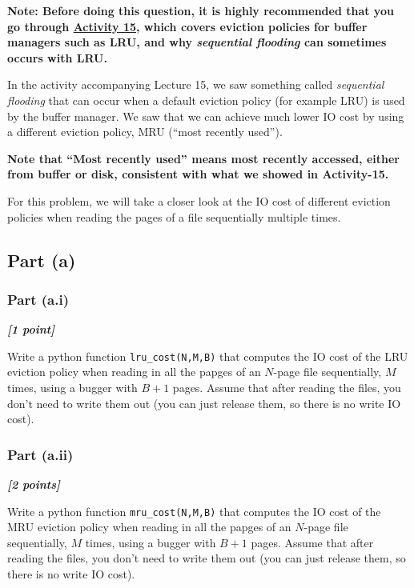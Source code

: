 \documentclass[11pt]{article}
\begin{document}
    \textbf{Note: Before doing this question, it is highly recommended that
you go through \href{./Activity-15.ipynb}{Activity 15}, which covers
eviction policies for buffer managers such as LRU, and why
\emph{sequential flooding} can sometimes occurs with LRU.}

In the activity accompanying Lecture 15, we saw something called
\emph{sequential flooding} that can occur when a default eviction policy
(for example LRU) is used by the buffer manager. We saw that we can
achieve much lower IO cost by using a different eviction policy, MRU
(``most recently used'').

\textbf{Note that ``Most recently used'' means most recently accessed,
either from buffer or disk, consistent with what we showed in
Activity-15.}

For this problem, we will take a closer look at the IO cost of different
eviction policies when reading the pages of a file sequentially multiple
times.

\hypertarget{part-a}{%
\subsection{Part (a)}\label{part-a}}

\hypertarget{part-a.i}{%
\subsubsection{Part (a.i)}\label{part-a.i}}

\textbf{\emph{{[}1 point{]}}}

Write a python function \texttt{lru\_cost(N,M,B)} that computes the IO
cost of the LRU eviction policy when reading in all the papges of an
\(N\)-page file sequentially, \(M\) times, using a bugger with \(B+1\)
pages. Assume that after reading the files, you don't need to write them
out (you can just release them, so there is no write IO cost).

    \hypertarget{part-a.ii}{%
\subsubsection{Part (a.ii)}\label{part-a.ii}}

\textbf{\emph{{[}2 points{]}}}

Write a python function \texttt{mru\_cost(N,M,B)} that computes the IO
cost of the MRU eviction policy when reading in all the papges of an
\(N\)-page file sequentially, \(M\) times, using a bugger with \(B+1\)
pages. Assume that after reading the files, you don't need to write them
out (you can just release them, so there is no write IO cost).
\end{document}
